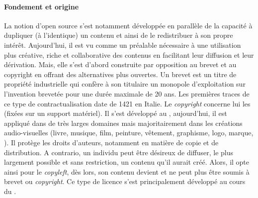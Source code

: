         \paragraph{Fondement et origine}
            La notion d'open source s'est notamment développée en parallèle de la capacité à dupliquer (à l'identique) un contenu et ainsi de le redistribuer à son propre intérêt. Aujourd'hui, il est vu comme un préalable nécessaire à une utilisation plus créative, riche et collaborative des contenus en facilitant leur diffusion et leur dérivation. Mais, elle s'est d'abord construite par opposition au brevet et au copyright en offrant des alternatives plus ouvertes. 
                Un brevet est un titre de propriété industrielle qui confère à son titulaire un monopole d'exploitation sur l'invention brevetée pour une durée maximale de 20 ans. Les premières traces de ce type de contractualisation date de 1421 en Italie.
                Le \textit{copyright} concerne lui les  (fixées sur un support matériel). Il s'est développé au , aujourd'hui, il est appliqué dans de très larges domaines mais majoritairement dans les créations audio-visuelles (livre, musique, film, peinture, vêtement, graphisme, logo, marque, \etc). Il protège les droits d'auteurs, notamment en matière de copie et de distribution.
                A contrario, un individu peut être désireux de diffuser, le plus largement possible et sans restriction, un contenu qu'il aurait créé. Alors, il opte ainsi pour le \textit{copyleft}, dès lors, son contenu devient  et ne peut plus être soumis à brevet ou \textit{copyright}. Ce type de licence s'est principalement développé au cours du .
